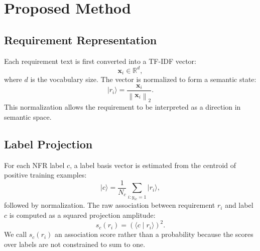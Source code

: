 \documentclass[runningheads]{llncs}
\begin{document}
\section{Proposed Method}
\subsection{Requirement Representation}
Each requirement text is first converted into a TF-IDF vector:
\begin{equation}
    \mathbf{x}_i \in \mathbb{R}^{d},
\end{equation}
where $d$ is the vocabulary size. The vector is normalized to form a semantic
state:
\begin{equation}
    \lvert r_i \rangle = \frac{\mathbf{x}_i}{\left\|\mathbf{x}_i\right\|_2}.
\end{equation}
This normalization allows the requirement to be interpreted as a direction in
semantic space.

\subsection{Label Projection}
For each NFR label $c$, a label basis vector is estimated from the centroid of
positive training examples:
\begin{equation}
    \lvert c \rangle = \frac{1}{N_c}\sum_{i:y_{ic}=1}\lvert r_i \rangle,
\end{equation}
followed by normalization. The raw association between requirement $r_i$ and
label $c$ is computed as a squared projection amplitude:
\begin{equation}
    s_c(r_i) = \left(\langle c \mid r_i \rangle\right)^2.
\end{equation}
We call $s_c(r_i)$ an association score rather than a probability because the
scores over labels are not constrained to sum to one.
\end{document}
